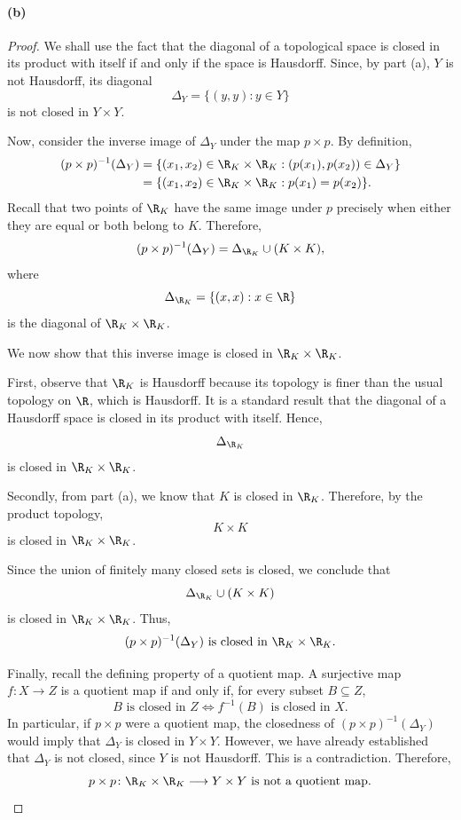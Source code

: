 \paragraph{(b)}
\begin{proof}
We shall use the fact that the diagonal of a topological space is closed in its product with
itself if and only if the space is Hausdorff. Since, by part (a), $Y$ is not Hausdorff, its
diagonal
\[ \Delta_Y=\{(y,y):y\in Y\} \]
is not closed in $Y\times Y$.

Now, consider the inverse image of $\Delta_Y$ under the map $p\times p$. By definition,
\begin{align*}
(p\times p)^{-1}(\Delta_Y)
&=\{(x_1,x_2)\in\R_K\times\R_K : (p(x_1),p(x_2))\in\Delta_Y\}\\
&=\{(x_1,x_2)\in\R_K\times\R_K : p(x_1)=p(x_2)\}.
\end{align*}
Recall that two points of $\R_K$ have the same image under $p$ precisely when either they are
equal or both belong to $K$. Therefore,
\[ (p\times p)^{-1}(\Delta_Y)=\Delta_{\R_K}\cup(K\times K), \]
where
\[ \Delta_{\R_K}=\{(x,x):x\in\R\} \]
is the diagonal of $\R_K\times\R_K$.

We now show that this inverse image is closed in $\R_K\times\R_K$.

First, observe that $\R_K$ is Hausdorff because its topology is finer than the usual topology
on $\R$, which is Hausdorff. It is a standard result that the diagonal of a Hausdorff space is
closed in its product with itself. Hence,
\[ \Delta_{\R_K} \]
is closed in $\R_K\times\R_K$.

Secondly, from part (a), we know that $K$ is closed in $\R_K$. Therefore, by the product
topology,
\[ K\times K \]
is closed in $\R_K\times\R_K$.

Since the union of finitely many closed sets is closed, we conclude that
\[ \Delta_{\R_K}\cup(K\times K) \]
is closed in $\R_K\times\R_K$. Thus,
\[ (p\times p)^{-1}(\Delta_Y) \text{ is closed in } \R_K\times\R_K. \]

Finally, recall the defining property of a quotient map. A surjective map $f\colon X\to Z$ is
a quotient map if and only if, for every subset $B\subseteq Z$,
\[ B \text{ is closed in } Z \iff f^{-1}(B) \text{ is closed in } X. \]
In particular, if $p\times p$ were a quotient map, the closedness of
$(p\times p)^{-1}(\Delta_Y)$ would imply that $\Delta_Y$ is closed in $Y\times Y$. However, we
have already established that $\Delta_Y$ is not closed, since $Y$ is not Hausdorff. This is a
contradiction. Therefore,
\[ p\times p\colon\R_K\times\R_K\longrightarrow Y\times Y \text{ is not a quotient map.} \qedhere \]
\end{proof}
